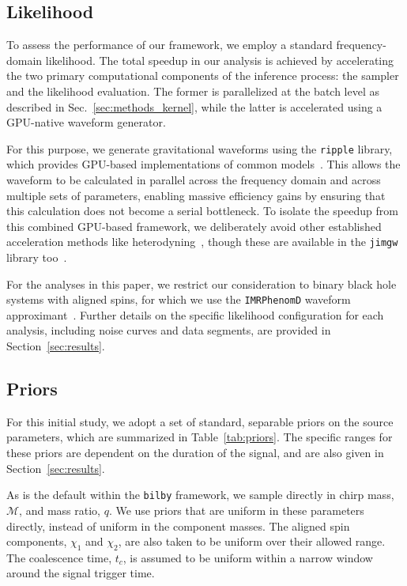 \documentclass[fleqn,usenatbib]{mnras}
\begin{document}
\subsection{Likelihood}

To assess the performance of our framework, we employ a standard
frequency-domain likelihood. The total
speedup in our analysis is achieved by accelerating the two primary
computational components of the inference process: the sampler and the
likelihood evaluation. The former is parallelized at the batch level as
described in Sec.~\ref{sec:methods_kernel}, while the latter is
accelerated using a GPU-native waveform generator.

For this purpose, we generate gravitational waveforms using the
\texttt{ripple} library, which provides GPU-based implementations of
common models~\citep{ripple, wong2023fastgravitationalwaveparameter, Wouters_BNS}. 
This allows the waveform to be calculated
in parallel across the frequency domain and 
across multiple sets of parameters, enabling massive efficiency gains by 
ensuring that this calculation does not become a serial bottleneck.
To isolate the speedup from this combined GPU-based framework,
we deliberately avoid other established acceleration methods like 
heterodyning~\citep{TL_relativebinning, relativebinning2, relativebinning3, relativebinning4}, 
though these are available in the \texttt{jimgw} library too~\citep{wong2023fastgravitationalwaveparameter}.

For the analyses in this paper, we restrict our consideration to binary
black hole systems with aligned spins, for which we use the
\texttt{IMRPhenomD} waveform approximant~\citep{Khan:2015jqa}.
Further details on the specific likelihood configuration for each
analysis, including noise curves and data segments, are provided in Section~\ref{sec:results}.

\subsection{Priors}

For this initial study, we adopt a set of standard, separable priors on
the source parameters, which are summarized in Table~\ref{tab:priors}.
The specific ranges for these priors are dependent on the duration of the signal, and are
also given in Section~\ref{sec:results}.

As is the default within the \texttt{bilby} framework, we sample directly in chirp mass, $\mathcal{M}$, and
mass ratio, $q$. We use priors that are uniform in these parameters directly, instead of uniform in the component masses. 
The aligned spin components, $\chi_1$ and $\chi_2$, are also taken to be uniform over
their allowed range. The coalescence time, $t_c$, is assumed to be uniform
within a narrow window around the signal trigger time.
\end{document}
